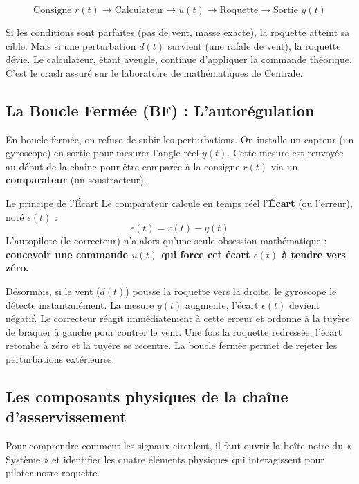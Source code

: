 \documentclass[11pt,a4paper]{report}
\begin{document}
\[ \text{Consigne } r(t) \longrightarrow \boxed{\text{Calculateur}} \longrightarrow u(t) \longrightarrow \boxed{\text{Roquette}} \longrightarrow \text{Sortie } y(t) \]

Si les conditions sont parfaites (pas de vent, masse exacte), la roquette atteint sa cible. Mais si une perturbation $d(t)$ survient (une rafale de vent), la roquette dévie. Le calculateur, étant aveugle, continue d'appliquer la commande théorique. C'est le crash assuré sur le laboratoire de mathématiques de Centrale.

\subsection{La Boucle Fermée (BF) : L'autorégulation}
En boucle fermée, on refuse de subir les perturbations. On installe un capteur (un gyroscope) en sortie pour mesurer l'angle réel $y(t)$. Cette mesure est renvoyée au début de la chaîne pour être comparée à la consigne $r(t)$ via un \textbf{comparateur} (un soustracteur).

\begin{defbox}{Le principe de l'Écart}
    Le comparateur calcule en temps réel l'\textbf{Écart} (ou l'erreur), noté $\epsilon(t)$ :
    \[ \epsilon(t) = r(t) - y(t) \]
    L'autopilote (le correcteur) n'a alors qu'une seule obsession mathématique : \textbf{concevoir une commande $u(t)$ qui force cet écart $\epsilon(t)$ à tendre vers zéro.}
\end{defbox}

Désormais, si le vent ($d(t)$) pousse la roquette vers la droite, le gyroscope le détecte instantanément. La mesure $y(t)$ augmente, l'écart $\epsilon(t)$ devient négatif. Le correcteur réagit immédiatement à cette erreur et ordonne à la tuyère de braquer à gauche pour contrer le vent. Une fois la roquette redressée, l'écart retombe à zéro et la tuyère se recentre. La boucle fermée permet de rejeter les perturbations extérieures.
\subsection{Les composants physiques de la chaîne d'asservissement}

Pour comprendre comment les signaux circulent, il faut ouvrir la boîte noire du « Système » et identifier les quatre éléments physiques qui interagissent pour piloter notre roquette.
\end{document}

